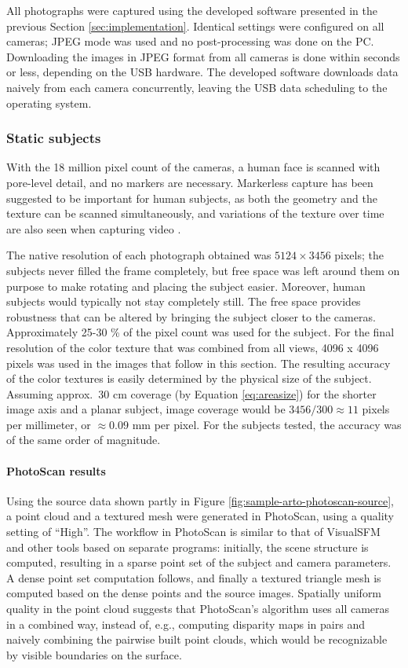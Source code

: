 All photographs were captured using the developed software presented in the previous Section \ref{sec:implementation}.
Identical settings were configured on all cameras; JPEG mode was used and no post-processing was done on the PC.
Downloading the images in JPEG format from all cameras is done within seconds or less, depending on the USB hardware.
The developed software downloads data naively from each camera concurrently, leaving the USB data scheduling to the operating system.
\subsubsection{Static subjects}

With the 18 million pixel count of the cameras, a human face is scanned with pore-level detail, and no markers are necessary.
Markerless capture has been suggested to be important for human subjects, as both the geometry and the texture can be scanned simultaneously, and variations of the texture over time are also seen when capturing video \cite{bradley2010high}.

The native resolution of each photograph obtained was $5124 \times 3456$ pixels; the subjects never filled the frame completely, but free space was left around them on purpose to make rotating and placing the subject easier.
Moreover, human subjects would typically not stay completely still.
The free space provides robustness that can be altered by bringing the subject closer to the cameras.
Approximately 25-30 \% of the pixel count was used for the subject.
For the final resolution of the color texture that was combined from all views, 4096 x 4096 pixels was used in the images that follow in this section.
The resulting accuracy of the color textures is easily determined by the physical size of the subject.
Assuming approx.\ 30 cm coverage (by Equation \ref{eq:areasize}) for the shorter image axis and a planar subject, image coverage would be $3456 / 300 \approx 11$ pixels per millimeter, or $\approx 0.09$ mm per pixel.
For the subjects tested, the accuracy was of the same order of magnitude.

\paragraph{PhotoScan results}
Using the source data shown partly in Figure \ref{fig:sample-arto-photoscan-source}, a point cloud and a textured mesh were generated in PhotoScan, using a quality setting of ``High''.
The workflow in PhotoScan is similar to that of VisualSFM and other tools based on separate programs:
initially, the scene structure is computed, resulting in a sparse point set of the subject and camera parameters.
A dense point set computation follows, and finally a textured triangle mesh is computed based on the dense points and the source images.
Spatially uniform quality in the point cloud suggests that PhotoScan's algorithm uses all cameras in a combined way, instead of, e.g., computing disparity maps in pairs and naively combining the pairwise built point clouds, which would be recognizable by visible boundaries on the surface.

